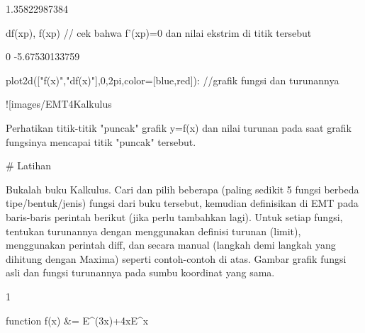 \documentclass{article}
\begin{document}
    1.35822987384

\>df(xp), f(xp) // cek bahwa f'(xp)=0 dan nilai ekstrim di titik tersebut


    0
    -5.67530133759

\>plot2d(["f(x)","df(x)"],0,2\*pi,color=[blue,red]): //grafik fungsi dan turunannya


![images/EMT4Kalkulus%

Perhatikan titik-titik "puncak" grafik y=f(x) dan nilai turunan pada saat grafik fungsinya mencapai titik "puncak" tersebut.


# Latihan

Bukalah buku Kalkulus. Cari dan pilih beberapa (paling sedikit 5
fungsi berbeda tipe/bentuk/jenis) fungsi dari buku tersebut, kemudian
definisikan di EMT pada baris-baris perintah berikut (jika perlu
tambahkan lagi). Untuk setiap fungsi, tentukan turunannya dengan
menggunakan definisi turunan (limit), menggunakan perintah diff, dan
secara manual (langkah demi langkah yang dihitung dengan Maxima)
seperti contoh-contoh di atas. Gambar grafik fungsi asli dan fungsi
turunannya pada sumbu koordinat yang sama.


                                1  

\>function f(x) &= E^(3\*x)+4\*x\*E^x
\end{document}
